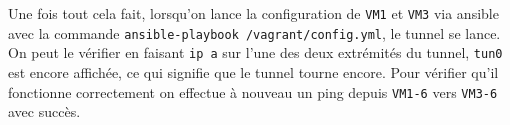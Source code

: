 \documentclass[a4paper, 12pt]{article}
\begin{document}
\begin{spacing}{1.1}
    Une fois tout cela fait, lorsqu'on lance la configuration de \verb+VM1+
    et \verb+VM3+ via ansible avec la commande \verb+ansible-playbook /vagrant/config.yml+, 
    le tunnel se lance. On peut le vérifier en faisant \verb+ip a+ sur l'une
    des deux extrémités du tunnel, \verb+tun0+ est encore affichée, ce qui 
    signifie que le tunnel tourne encore. Pour vérifier qu'il fonctionne 
    correctement on effectue à nouveau un ping depuis \verb+VM1-6+ vers 
    \verb+VM3-6+ avec succès.

    \end{spacing}
\end{document}
